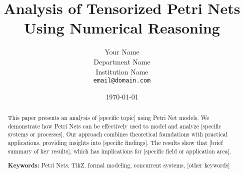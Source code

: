 \documentclass[10pt,twocolumn]{article}
\title{Analysis of Tensorized Petri Nets Using Numerical Reasoning}
\author{
  Your Name \\
  Department Name \\
  Institution Name \\
  \texttt{email@domain.com}
}
\date{\today}
\begin{document}
\maketitle

\begin{abstract}
This paper presents an analysis of [specific topic] using Petri Net models. We demonstrate how Petri Nets can be effectively used to model and analyze [specific systems or processes]. Our approach combines theoretical foundations with practical applications, providing insights into [specific findings]. The results show that [brief summary of key results], which has implications for [specific field or application area].

\textbf{Keywords:} Petri Nets, TikZ, formal modeling, concurrent systems, [other keywords]
\end{abstract}









\end{document}
